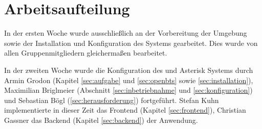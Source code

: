 \section{Arbeitsaufteilung}
In der ersten Woche wurde ausschließlich an der Vorbereitung der Umgebung sowie der Installation und Konfiguration des \OpenBTS Systems gearbeitet. Dies wurde von allen Gruppenmitgliedern gleichermaßen bearbeitet.

In der zweiten Woche wurde die Konfiguration des \OpenBTS und Asterisk Systems durch Armin Grodon (Kapitel \ref{sec:aufgabe} und \ref{sec:openbts} sowie \autoref{sec:installation}), 
Maximilian Briglmeier (Abschnitt \ref{sec:inbetriebnahme} und \ref{sec:konfiguration})
und Sebastian Bögl (\autoref{sec:herausforderung}) fortgeführt. 
Stefan Kuhn implementierte in dieser Zeit das Frontend (Kapitel \ref{sec:frontend}), 
Christian Gassner das Backend (Kapitel \ref{sec:backend}) der Anwendung.